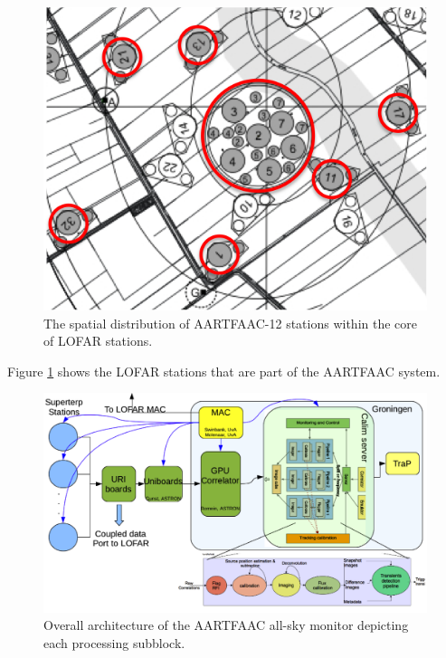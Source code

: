 \documentclass{aa}
\begin{document}
\begin{figure}[htbp]
\centering
\includegraphics[width=1\textwidth]{Figs/afaac12_arrayconfig.png}
\caption{The spatial distribution of AARTFAAC-12 stations within the core of LOFAR stations.}
\label{fig:afaac12_arrayconfig}
\end{figure}

Figure \ref{fig:afaac12_arrayconfig} shows  the LOFAR stations that  are part of
the AARTFAAC system.

\begin{figure}[htbp]
\centering
\includegraphics[width=1\textwidth]{Figs/overall_afaac_Arch_blks.png}
\caption{Overall architecture of the AARTFAAC all-sky monitor depicting each processing subblock.}
\label{fig:afaac_arch}
\end{figure}
\end{document}
